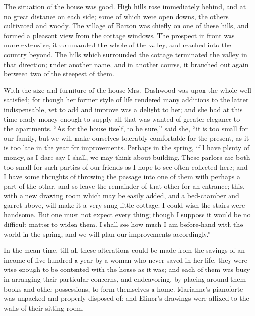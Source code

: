 The situation of the house was good.  High hills rose
immediately behind, and at no great distance on each side;
some of which were open downs, the others cultivated and woody.
The village of Barton was chiefly on one of these hills,
and formed a pleasant view from the cottage windows.
The prospect in front was more extensive; it commanded the
whole of the valley, and reached into the country beyond.
The hills which surrounded the cottage terminated
the valley in that direction; under another name,
and in another course, it branched out again between two
of the steepest of them.

With the size and furniture of the house Mrs.\ Dashwood
was upon the whole well satisfied; for though her former
style of life rendered many additions to the latter
indispensable, yet to add and improve was a delight to her;
and she had at this time ready money enough to supply all
that was wanted of greater elegance to the apartments.
``As for the house itself, to be sure,'' said she, ``it is
too small for our family, but we will make ourselves
tolerably comfortable for the present, as it is too late
in the year for improvements.  Perhaps in the spring,
if I have plenty of money, as I dare say I shall, we may
think about building.  These parlors are both too small
for such parties of our friends as I hope to see often
collected here; and I have some thoughts of throwing the
passage into one of them with perhaps a part of the other,
and so leave the remainder of that other for an entrance;
this, with a new drawing room which may be easily added,
and a bed-chamber and garret above, will make it a very snug
little cottage.  I could wish the stairs were handsome.
But one must not expect every thing; though I suppose it
would be no difficult matter to widen them.  I shall see
how much I am before-hand with the world in the spring,
and we will plan our improvements accordingly.''

In the mean time, till all these alterations could
be made from the savings of an income of five hundred
a-year by a woman who never saved in her life, they were
wise enough to be contented with the house as it was;
and each of them was busy in arranging their particular
concerns, and endeavoring, by placing around them books
and other possessions, to form themselves a home.
Marianne's pianoforte was unpacked and properly disposed of;
and Elinor's drawings were affixed to the walls of their
sitting room.

